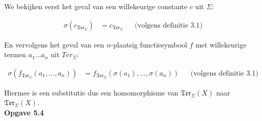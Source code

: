 \documentclass[a4paper,11pt]{article}
\begin{document}
We bekijken eerst het geval van een willekeurige constante $c$ uit $\Sigma$:

\begin{align*}
\sigma(c_{\mathfrak{Ter}_{\Sigma}})
&= c_{\mathfrak{Ter}_{\Sigma}} &&\text{(volgens definitie 3.1)}
\end{align*}

En vervolgens het geval van een $n$-plaatsig functiesymbool $f$ met
willekeurige termen $a_{1} \ldots a_{n}$ uit $Ter_{\Sigma}$:

\begin{align*}
\sigma(f_{\mathfrak{Ter}_{\Sigma}}(a_{1}, \ldots, a_{n}))
&= f_{\mathfrak{Ter}_{\Sigma}}(\sigma(a_{1}), \ldots, \sigma(a_{n}))
&&\text{(volgens definitie 3.1)}
\end{align*}

Hiermee is een substitutie dus een homomorphisme van
$\mathfrak{Ter}_{\Sigma}(X)$ naar $\mathfrak{Ter}_{\Sigma}(X)$.\\[2em]


{\bf Opgave 5.4}
\end{document}
